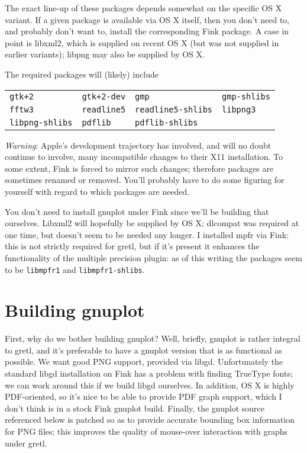 \documentclass{article}
\begin{document}
The exact line-up of these packages depends somewhat on the specific
OS X variant.  If a given package is available via OS X itself, then
you don't need to, and probably don't want to, install the
corresponding Fink package.  A case in point is libxml2, which is
supplied on recent OS X (but was not supplied in earlier variants);
libpng may also be supplied by OS X.

The required packages will (likely) include

\begin{center}
{\small
\begin{tabular}{llll}
\texttt{gtk+2} & \texttt{gtk+2-dev} & \texttt{gmp} & 
\texttt{gmp-shlibs} \\
\texttt{fftw3} & \texttt{readline5} & \texttt{readline5-shlibs} 
& \texttt{libpng3} \\
 \texttt{libpng-shlibs} & \texttt{pdflib} & \texttt{pdflib-shlibs}
\end{tabular}
}
\end{center}

\textit{Warning}: Apple's development trajectory has involved, and
will no doubt continue to involve, many incompatible changes to their
X11 installation.  To some extent, Fink is forced to mirror such
changes; therefore packages are sometimes renamed or removed.  You'll
probably have to do some figuring for yourself with regard to which
packages are needed. 

You don't need to install gnuplot under Fink since we'll be building
that ourselves.  Libxml2 will hopefully be supplied by OS X; dlcompat
was required at one time, but doesn't seem to be needed any longer.  I
installed mpfr via Fink: this is not strictly required for gretl, but
if it's present it enhances the functionality of the multiple
precision plugin: as of this writing the packages seem to be
\texttt{libmpfr1} and \texttt{libmpfr1-shlibs}.


\section{Building gnuplot}
\label{sec:gpbuild}

First, why do we bother building gnuplot?  Well, briefly, gnuplot is
rather integral to gretl, and it's preferable to have a gnuplot
version that is as functional as possible.  We want good PNG support,
provided via libgd.  Unfortunately the standard libgd installation on
Fink has a problem with finding TrueType fonts; we can work around
this if we build libgd ourselves.  In addition, OS X is highly
PDF-oriented, so it's nice to be able to provide PDF graph support,
which I don't think is in a stock Fink gnuplot build.  Finally, the
gnuplot source referenced below is patched so as to provide accurate
bounding box information for PNG files; this improves the quality of
mouse-over interaction with graphs under gretl.
\end{document}
